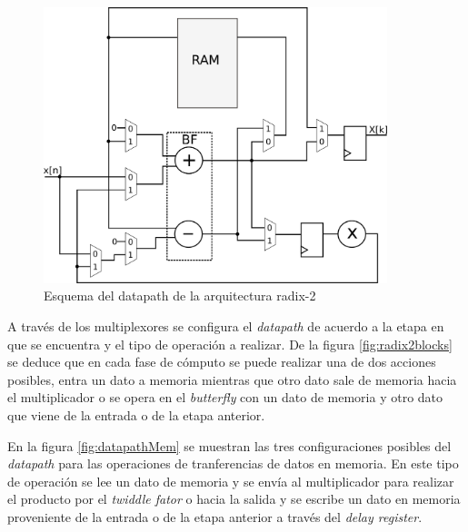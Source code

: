 \begin{figure}[htb!]
        \centering
        \includegraphics[width=10cm]{./figures/datapath.png}
        \caption{Esquema del datapath de la arquitectura radix-2}
        \label{fig:datapath}
\end{figure}

A través de los multiplexores se configura el \textit{datapath} de acuerdo a la etapa en que se encuentra y
el tipo de operación a realizar. De la figura \ref{fig:radix2blocks} se deduce que en cada fase de
cómputo se puede realizar una de dos acciones posibles, entra un dato a memoria mientras que otro dato 
sale de memoria hacia el multiplicador o se opera en el \textit{butterfly} con un dato de memoria y otro dato que viene
de la entrada o de la etapa anterior.

En la figura \ref{fig:datapathMem} se muestran las tres configuraciones posibles del \textit{datapath} para
las operaciones de tranferencias de datos en memoria. En este tipo de operación se lee un dato de
memoria y se envía al multiplicador para realizar el producto por el \textit{twiddle fator} o hacia
la salida y se escribe un dato en memoria proveniente de la entrada o de la etapa anterior a través
del \textit{delay register}.



